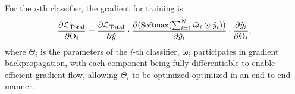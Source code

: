 
For the \(i\)-th classifier, the gradient for training is:
\begin{equation}
\frac{\partial{\mathcal{L}_{\text{Total}}}}{\partial{\Theta_{i}}} = \frac{\partial{\mathcal{L}_{\text{Total}}}}{\partial{\hat{y}}} \cdot 
\frac{\partial(\text{\small{Softmax}}(\sum_{i=1}^{N}\bar{\boldsymbol{\omega}}_{i} \odot \hat{y}_{i}))}{\partial{\hat{y}_{i}}} \cdot \frac{\partial \hat{y}_{i}}{\partial \Theta_{i}},
\end{equation}
where \(\Theta_{i}\) is the parameters of the \(i\)-th classifier, $\bar{\boldsymbol{\omega}}_{i}$ participates in gradient backpropagation, with each component being fully differentiable to enable efficient gradient flow, allowing \(\Theta_{i}\) to be optimized optimized in an end-to-end manner. 



